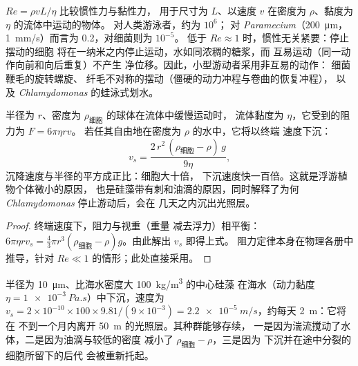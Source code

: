 \begin{proposition}[低雷诺数下的生命]\label{prop:b2:unicellular-diversity:reynolds}
\emph{} $Re = \rho v L/\eta$ 比较惯性力与黏性力，
用于尺寸为 $L$、以速度 $v$ 在密度为 $\rho$、黏度为 $\eta$ 的流体中运动的物体。
对人类游泳者，约为 $10^6$；
对 \emph{Paramecium}（\qty{200}{\micro m}，
\qty{1}{mm/s}）而言为 0.2，对细菌则为 $10^{-5}$。
低于 $Re \approx 1$ 时，惯性无关紧要：停止摆动的细胞
将在一纳米之内停止运动，水如同浓稠的糖浆，而
互易运动（同一动作向前和向后重复）不产生
净位移。因此，小型游动者采用非互易的动作：
细菌鞭毛的旋转螺旋、
纤毛不对称的摆动（僵硬的动力冲程与卷曲的恢复冲程），
以及 \emph{Chlamydomonas} 的蛙泳式划水。
\end{proposition}

\begin{theorem}[斯托克斯定律与沉降]\label{thm:b2:unicellular-diversity:stokes}
半径为 $r$、密度为 $\rho_{\text{细胞}}$ 的球体在流体中缓慢运动时，
流体黏度为 $\eta$，它受到的阻力为 $F = 6\pi\eta r v$。
若任其自由地在密度为 $\rho$ 的水中，它将以终端
速度下沉：
\[
v_s = \frac{2\,r^2\,(\rho_{\text{细胞}} - \rho)\,g}{9\eta},
\]
沉降速度与半径的平方成正比：细胞大十倍，
下沉速度快一百倍。这就是浮游植物个体微小的原因，
也是硅藻带有刺和油滴的原因，同时解释了为何
\emph{Chlamydomonas} 停止游动后，会在
几天之内沉出光照层。
\end{theorem}
\begin{proof}
终端速度下，阻力与视重（重量
减去浮力）相平衡：$6\pi\eta r v_s = \tfrac{4}{3}\pi r^3
(\rho_{\text{细胞}} - \rho) g$。由此解出 $v_s$ 即得上式。
阻力定律本身在物理各册中推导，针对
$Re \ll 1$ 的情形；此处直接采用。
\end{proof}

\begin{example}[硅藻的下沉]\label{ex:b2:unicellular-diversity:fall}
半径为 \qty{10}{\micro m}、比海水密度大 \qty{100}{kg/m^3} 的中心硅藻
在海水（动力黏度 $\eta = \qty{1e-3}{Pa.s}$）中下沉，速度为
$v_s = 2\times 10^{-10}\times 100\times 9.81/(9\times 10^{-3}) =
\qty{2.2e-5}{m/s}$，约每天 \qty{2}{m}：它将在
不到一个月内离开 \qty{50}{m} 的光照层。其种群能够存续，
一是因为湍流搅动了水体，二是因为油滴与较低的密度
减小了 $\rho_{\text{细胞}} - \rho$，三是因为
下沉并在途中分裂的细胞所留下的后代
会被重新托起。
\end{example}

